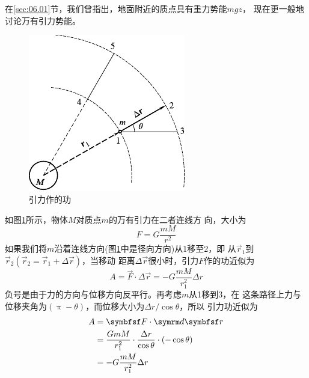 \section[引力势能]{}\label{sec:06.03}

在\ref{sec:06.01}节，我们曾指出，地面附近的质点具有重力势能$ mgz $，
现在更一般地讨论万有引力势能。

\begin{figure}
  \vspace{-2em}
  \centering
  \includegraphics{figure/fig06.06}
  \caption{引力作的功}
  \label{fig:06.06}
\end{figure}
如图\ref{fig:06.06}所示，物体$ M $对质点$ m $的万有引力在二者连线方
向，大小为%
\begin{equation*}
  F = G \frac { m M } { r ^ { 2 } }
\end{equation*}
如果我们将$ m $沿着连线方向(图\ref{fig:06.06}\;中是径向方向)从1移至2，即
从$ \vec{r} _ 1 $到$ \vec{r} _ 2 \left( \vec{r} _ 2 = \vec{r} _ 1 + \Delta \vec{r} \right) $，当移动
距离$ \Delta \vec{r} $很小时，引力$ F $作的功近似为
\begin{equation*}
  A = \vec{F} \cdot \Delta \vec{r} = - G \frac { m M } { r _ 1 ^ { 2 } } \Delta r
\end{equation*}
负号是由于力的方向与位移方向反平行。再考虑$ m $从1移到3，在
这条路径上力与位移夹角为$ \left( \uppi - \theta \right) $，而位移大小为$ \Delta r / \cos \theta $，所以
引力功近似为
\begin{equation*}
  \begin{aligned}
    A & = \vec{F} \cdot \dif \vec{r}                                                                                        \\
      & = \frac { G m M } { r _ { 1 } ^ { 2 } } \cdot \frac { \Delta r } { \cos \theta } \cdot \left( - \cos \theta \right) \\
      & = - G \frac { m M } { r _ 1 ^ { 2 } } \Delta r
  \end{aligned}
\end{equation*}

